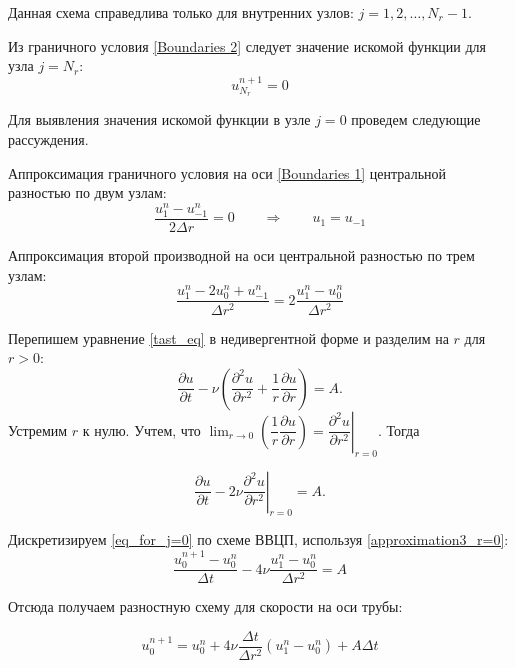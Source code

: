 Данная схема справедлива только для внутренних узлов: $j = 1, 2, \dots, N_r - 1$.

Из граничного условия \eqref{Boundaries 2} следует значение искомой функции для узла $j = N_r$:
\begin{equation}
	u_{N_r}^{n+1} = 0
\end{equation}

Для выявления значения искомой функции в узле $j = 0$ проведем следующие рассуждения.

Аппроксимация граничного условия на оси \eqref{Boundaries 1} центральной разностью по двум узлам:
\begin{equation}
	\dfrac{u_1^n - u_{-1}^n}{2\Delta r} = 0 \qquad \Rightarrow \qquad u_1 = u_{-1}
\end{equation}

Аппроксимация второй производной на оси центральной разностью по трем узлам:
\begin{equation} \label{approximation3_r=0}
	\dfrac{u_1^n - 2u_0^n + u_{-1}^n}{\Delta r^2} = 2\dfrac{u_1^n - u_0^n}{\Delta r^2}
\end{equation}

Перепишем уравнение \eqref{tast_eq} в недивергентной форме и разделим на $r$ для $r>0$:
\begin{equation}
	\dfrac{\partial u}{\partial t} - \nu \left( \dfrac{\partial^2 u}{\partial r^2} + \dfrac{1}{r} \dfrac{\partial u}{\partial r} \right) = A.
\end{equation}
Устремим $r$ к нулю. Учтем, что $\lim_{r \to 0} \left( \dfrac{1}{r} \dfrac{\partial u}{\partial r} \right) = \left. \dfrac{\partial^2 u}{\partial r^2} \right|_{r=0}$. Тогда

\begin{equation} \label{eq_for_j=0}
	\dfrac{\partial u}{\partial t} - 2\nu \left. \dfrac{\partial^2 u}{\partial r^2} \right|_{r=0} = A.
\end{equation}

Дискретизируем \eqref{eq_for_j=0} по схеме ВВЦП, используя \eqref{approximation3_r=0}:
\begin{equation}
	\dfrac{u_0^{n+1} - u_0^n}{\Delta t} - 4 \nu \dfrac{u_1^n - u_0^n}{\Delta r^2} = A 
\end{equation}

Отсюда получаем разностную схему для скорости на оси трубы:

\begin{equation}
	u_0^{n+1} = u_0^n + 4 \nu \dfrac{\Delta t}{\Delta r^2} \left( u_1^n - u_0^n \right) + A\Delta t
\end{equation}

